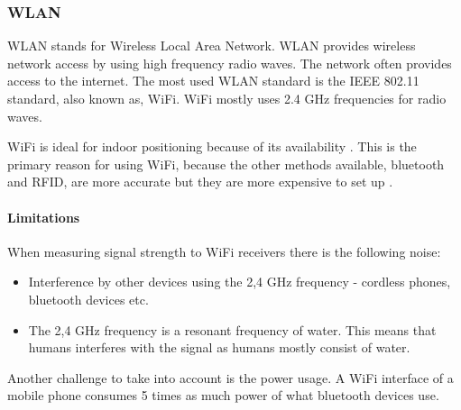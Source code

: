 \subsubsection{WLAN}\label{wifi}
WLAN stands for Wireless Local Area Network.
WLAN provides wireless network access by using high frequency radio waves.
The network often provides access to the internet.
The most used WLAN standard is the IEEE 802.11 standard\cite{ieee_wifi_standard}, also known as, WiFi.
WiFi mostly uses 2.4 GHz frequencies for radio waves\cite{ieee_wifi_standard}.


WiFi is ideal for indoor positioning because of its availability
\cite{indoor_maps_google_slides}\cite{improving_wifi_using_bluetooth}.
This is the primary reason for using WiFi, because the other methods available, bluetooth and RFID, are more accurate but they are more expensive to set up \cite{improving_wifi_using_bluetooth}.

\paragraph{Limitations}
When measuring signal strength to WiFi receivers there is the following noise:
 \begin{itemize}
 	\item Interference by other devices using the 2,4 GHz frequency - cordless phones, bluetooth devices etc.
 	\item The 2,4 GHz frequency is a resonant frequency of water. This means that humans interferes with the signal as humans mostly consist of water.
\end{itemize}

Another challenge to take into account is the power usage.
A WiFi interface of a mobile phone consumes 5 times as much power of what bluetooth devices use\cite{bluetooth_basics}.